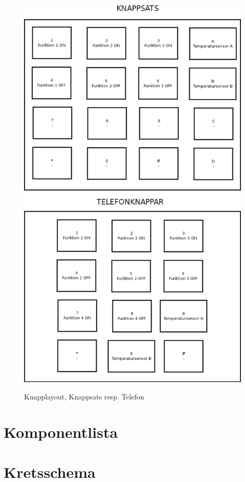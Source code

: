 \documentclass[a4paper,11pt]{article}
\begin{document}
		\begin{figure}[ht!]
		  \centering
		      \includegraphics[scale=0.48, angle=0]{UserInterface.png}
			\label{fig:UserInterface}
		  	\caption{Knapplayout, Knappsats resp. Telefon}
		\end{figure}

	\section{Komponentlista}

	\section{Kretsschema}
\end{document}
